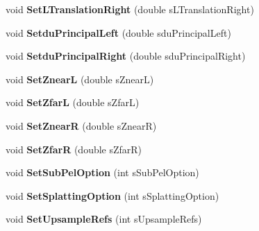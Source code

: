 \begin{DoxyCompactItemize}
void {\bfseries Set\+L\+Translation\+Right} (double s\+L\+Translation\+Right)
\item 
\mbox{\label{class_c_view_interpolation1_d_ae6001c34f790f58e933e1d026d3f5b2e}} 
void {\bfseries Setdu\+Principal\+Left} (double sdu\+Principal\+Left)
\item 
\mbox{\label{class_c_view_interpolation1_d_aadaf5a642754bf8f90058796a3fe4754}} 
void {\bfseries Setdu\+Principal\+Right} (double sdu\+Principal\+Right)
\item 
\mbox{\label{class_c_view_interpolation1_d_a3f2190adc6b09edd684929b6da3af529}} 
void {\bfseries Set\+ZnearL} (double s\+ZnearL)
\item 
\mbox{\label{class_c_view_interpolation1_d_a2ef4895f52c96ebffdcd8aebbfb5d6d6}} 
void {\bfseries Set\+ZfarL} (double s\+ZfarL)
\item 
\mbox{\label{class_c_view_interpolation1_d_a89d5b10dcfae44a6e8c9510cdcbbcc67}} 
void {\bfseries Set\+ZnearR} (double s\+ZnearR)
\item 
\mbox{\label{class_c_view_interpolation1_d_a9507d69ed643405ad429be9e8e6a14f3}} 
void {\bfseries Set\+ZfarR} (double s\+ZfarR)
\item 
\mbox{\label{class_c_view_interpolation1_d_a926bf1d7a006bba4d83c5fc6129770ef}} 
void {\bfseries Set\+Sub\+Pel\+Option} (int s\+Sub\+Pel\+Option)
\item 
\mbox{\label{class_c_view_interpolation1_d_a665f5b9c845b686b057ba965b57dfd04}} 
void {\bfseries Set\+Splatting\+Option} (int s\+Splatting\+Option)
\item 
\mbox{\label{class_c_view_interpolation1_d_a690a6910bbdaa8363d35f413f0e8dade}} 
void {\bfseries Set\+Upsample\+Refs} (int s\+Upsample\+Refs)
\item 
\mbox{\label{class_c_view_interpolation1_d_ad8e7f0066ced5c8add88f921bf84deb8}} 

\end{DoxyCompactItemize}
